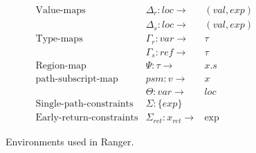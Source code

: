 \begin{figure}
$$
\begin{array}{lllll}
\text{Value-maps} & \Delta_r: loc \rightarrow & ( val, exp) &&
\\
& \Delta_s: loc \rightarrow & ( val, exp) &&
\\
\text{Type-maps}  & \Gamma_r: var \rightarrow & \tau & &
\\
& \Gamma_s: ref \rightarrow & \tau&&
\\
\text{Region-map} & \Psi: \tau \rightarrow & x.s &&
\\
\text{path-subscript-map} & psm: v \rightarrow & x &&
\\
& \Theta: var \rightarrow & loc &&
\\
\text{Single-path-constraints} & \Sigma: \{exp\} &  &  & 
\\
\text{Early-return-constraints} & \Sigma_{ret}: x_{ret} \rightarrow & \exp &  & 
\end{array}
$$
\caption{Environments used in Ranger.}
\label{fig:environment}
\end{figure}

